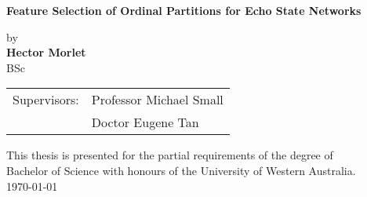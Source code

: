 
\vspace*{0.4cm}
\begin{center}
{ \huge \bfseries Feature Selection of Ordinal Partitions for Echo State Networks  \\[0.4cm] }
\vspace{1cm}
\end{center}
\begin{center}
\large
by\\
\vspace{1.5cm}
\textbf{Hector Morlet}\\
BSc\\
\vspace{1cm}
\end{center}
\vspace{3cm}

\begin{tabular}{ p{2.2cm}l } 
Supervisors: & Professor Michael Small\\
			&  Doctor Eugene Tan
\end{tabular}

\vfill
\begin{center}
This thesis is presented for the partial requirements of the degree of\\ Bachelor of Science with honours
of the University of Western Australia.\\
\today
\end{center}
\vspace{2.5cm}